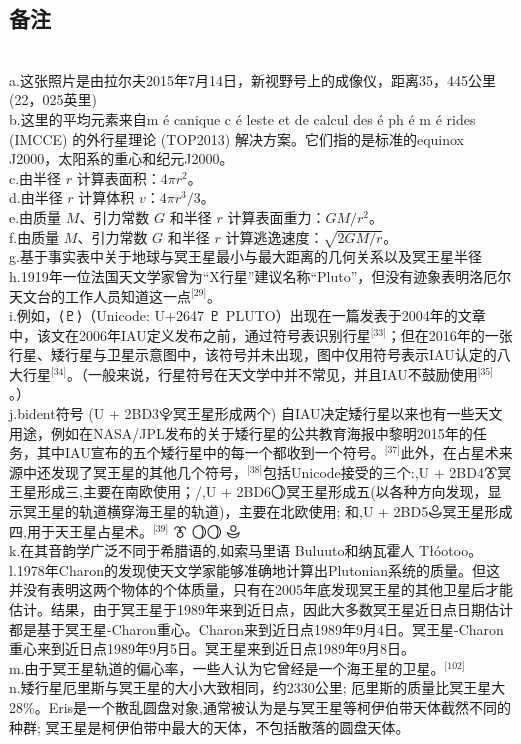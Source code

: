 \subsection{备注}\\
a.这张照片是由拉尔夫2015年7月14日，新视野号上的成像仪，距离35，445公里 (22，025英里)\\
b.这里的平均元素来自m é canique c é leste et de calcul des é ph é m é rides (IMCCE) 的外行星理论 (TOP2013) 解决方案。它们指的是标准的equinox J2000，太阳系的重心和纪元J2000。\\
c.由半径 \(r\) 计算表面积：\(4\pi r^{2}\)。\\
d.由半径 \(r\) 计算体积 \(v\)：\(4\pi r^{3}/3\)。\\
e.由质量 \(M\)、引力常数 \(G\) 和半径 \(r\) 计算表面重力：\(GM/r^{2}\)。\\
f.由质量 \(M\)、引力常数 \(G\) 和半径 \(r\) 计算逃逸速度：\(\sqrt{2GM/r}\)。\\
g.基于事实表中关于地球与冥王星最小与最大距离的几何关系以及冥王星半径\\
h.1919年一位法国天文学家曾为“X行星”建议名称“Pluto”，但没有迹象表明洛厄尔天文台的工作人员知道这一点\(^\text{[29]}\)。\\
i.例如，⟨♇⟩（Unicode: U+2647 ♇ PLUTO）出现在一篇发表于2004年的文章中，该文在2006年IAU定义发布之前，通过符号表识别行星\(^\text{[33]}\)；但在2016年的一张行星、矮行星与卫星示意图中，该符号并未出现，图中仅用符号表示IAU认定的八大行星\(^\text{[34]}\)。（一般来说，行星符号在天文学中并不常见，并且IAU不鼓励使用\(^\text{[35]}\)。）\\
j.bident符号 (U + 2BD3⯓冥王星形成两个) 自IAU决定矮行星以来也有一些天文用途，例如在NASA/JPL发布的关于矮行星的公共教育海报中黎明2015年的任务，其中IAU宣布的五个矮行星中的每一个都收到一个符号。\(^\text{[37]}\)此外，在占星术来源中还发现了冥王星的其他几个符号，\(^\text{[38]}\)包括Unicode接受的三个:,U + 2BD4⯔冥王星形成三,主要在南欧使用；/,U + 2BD6⯖冥王星形成五(以各种方向发现，显示冥王星的轨道横穿海王星的轨道)，主要在北欧使用; 和,U + 2BD5⯕冥王星形成四,用于天王星占星术。\(^\text{[39]}\) ⯔ ⯖⯖ ⯕\\
k.在其音韵学广泛不同于希腊语的,如索马里语 Buluuto和纳瓦霍人 Tłóotoo。\\
l.1978年Charon的发现使天文学家能够准确地计算出Plutonian系统的质量。但这并没有表明这两个物体的个体质量，只有在2005年底发现冥王星的其他卫星后才能估计。结果，由于冥王星于1989年来到近日点，因此大多数冥王星近日点日期估计都是基于冥王星-Charon重心。Charon来到近日点1989年9月4日。冥王星-Charon重心来到近日点1989年9月5日。冥王星来到近日点1989年9月8日。\\
m.由于冥王星轨道的偏心率，一些人认为它曾经是一个海王星的卫星。\(^\text{[102]}\)\\
n.矮行星厄里斯与冥王星的大小大致相同，约2330公里; 厄里斯的质量比冥王星大28\%。Eris是一个散乱圆盘对象,通常被认为是与冥王星等柯伊伯带天体截然不同的种群; 冥王星是柯伊伯带中最大的天体，不包括散落的圆盘天体。
